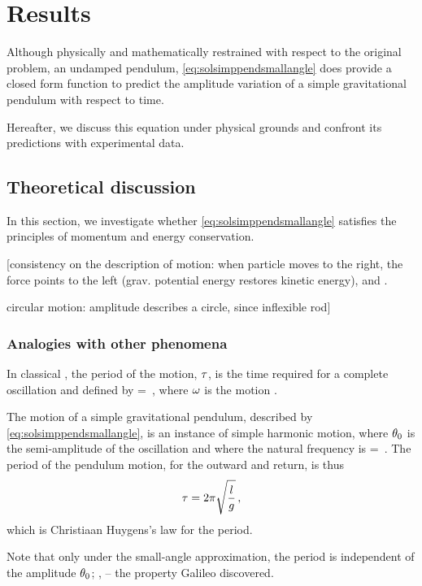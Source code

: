 \section{Results}
Although physically and mathematically restrained with respect to the original problem, an undamped pendulum,  \cref{eq:solsimppendsmallangle} does provide a closed form function to predict the amplitude variation of a simple gravitational pendulum with respect to time. 

Hereafter, we discuss this equation under physical grounds and confront its predictions with experimental data.


\subsection{Theoretical discussion}
In this section, we investigate whether \cref{eq:solsimppendsmallangle} satisfies the principles of momentum and energy conservation.

[consistency on the description of motion: when particle moves to the right, the force points to the left (grav. potential energy restores kinetic energy), and \vis.

circular motion: amplitude describes a circle, since inflexible rod]


\subsubsection{Analogies with other phenomena}\label{subsec:analogieswithotherphenomena}
In classical , the period of the motion, $\tau$, is the time required for a complete oscillation and defined by
\beq
\oscper = \dfrac{2\pi}{\natfreq}\,,
\eeq
where $\omega$ is the motion .

The motion of a simple gravitational pendulum, described by \cref{eq:solsimppendsmallangle}, is an instance of simple harmonic motion, where $\theta_0$ is the semi-amplitude of the oscillation and where the natural frequency is
\beq
\natfreq = \sqrt{\dfrac{\grav}{\length}}\,.
\eeq
The period of the pendulum motion, for the outward and return, is thus
\begin{equation}\label{eq:simplependulumperiod}
\tau = 2\pi\sqrt{\dfrac{l}{g}}\,,
\end{equation}
which is Christiaan Huygens's law for the period.

Note that only under the small-angle approximation, the period is independent of the amplitude $\theta_0$; \ie,  -- the property Galileo discovered.


